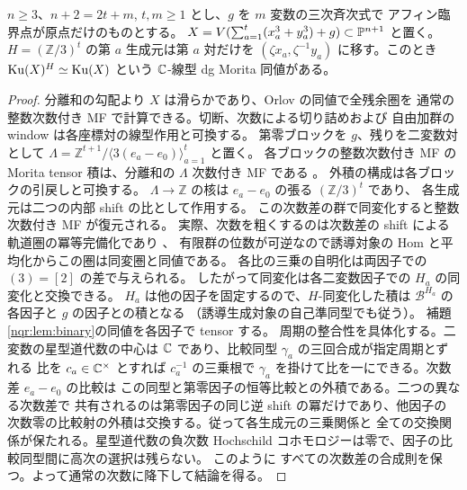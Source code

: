 \begin{corollary}[任意次元の分離した二変数対]\label{nqr:cor:separated-pairs}
$n\ge3$、$n+2=2t+m$, $t,m\ge1$ とし、$g$ を $m$ 変数の三次斉次式で
アフィン臨界点が原点だけのものとする。
$X=V(\sum_{a=1}^t(x_a^3+y_a^3)+g)\subset\mathbb P^{n+1}$ と置く。
$H=(\mathbb Z/3)^t$ の第 $a$ 生成元は第 $a$ 対だけを
$(\zeta x_a,\zeta^{-1}y_a)$ に移す。このとき
$\operatorname{Ku}(X)^H\simeq\operatorname{Ku}(X)$ という $\mathbb C$-線型 dg Morita 同値がある。
\end{corollary}
\begin{proof}
分離和の勾配より $X$ は滑らかであり、Orlov の同値で全残余圏を
通常の整数次数付き MF で計算できる。切断、次数による切り詰めおよび
自由加群の window は各座標対の線型作用と可換する。
第零ブロックを $g$、残りを二変数対として
$\Lambda=\mathbb Z^{t+1}/\langle 3(e_a-e_0)\rangle_{a=1}^t$ と置く。
各ブロックの整数次数付き MF の Morita tensor 積は、分離和の
$\Lambda$ 次数付き MF である
\cite[Corollary~2.40 and (3.5)]{MBRDBFKFurther}。
外積の構成は各ブロックの引戻しと可換する。
$\Lambda\to\mathbb Z$ の核は $e_a-e_0$ の張る $(\mathbb Z/3)^t$ であり、
各生成元は二つの内部 shift の比として作用する。
この次数差の群で同変化すると整数次数付き MF が復元される。
実際、次数を粗くするのは次数差の shift による軌道圏の冪等完備化であり
\cite[Proposition~4.5, Corollary~4.6]{MBRDBFKFurther}、
有限群の位数が可逆なので誘導対象の Hom と平均化からこの圏は同変圏と同値である。
各比の三乗の自明化は両因子での $(3)=[2]$ の差で与えられる。
したがって同変化は各二変数因子での $H_a$ の同変化と交換できる。
$H_a$ は他の因子を固定するので、$H$-同変化した積は
$\mathcal B^{H_a}$ の各因子と $g$ の因子との積となる
（誘導生成対象の自己準同型でも従う）。
補題\ref{nqr:lem:binary}の同値を各因子で tensor する。
周期の整合性を具体化する。二変数の星型道代数の中心は
$\mathbb C$ であり、比較同型 $\gamma_a$ の三回合成が指定周期とずれる
比を $c_a\in\mathbb C^\times$ とすれば $c_a^{-1}$ の三乗根で
$\gamma_a$ を掛けて比を一にできる。次数差 $e_a-e_0$ の比較は
この同型と第零因子の恒等比較との外積である。二つの異なる次数差で
共有されるのは第零因子の同じ逆 shift の冪だけであり、他因子の
次数零の比較射の外積は交換する。従って各生成元の三乗関係と
全ての交換関係が保たれる。星型道代数の負次数 Hochschild
コホモロジーは零で、因子の比較同型間に高次の選択は残らない。
このように
すべての次数差の合成則を保つ。よって通常の次数に降下して結論を得る。
\end{proof}

